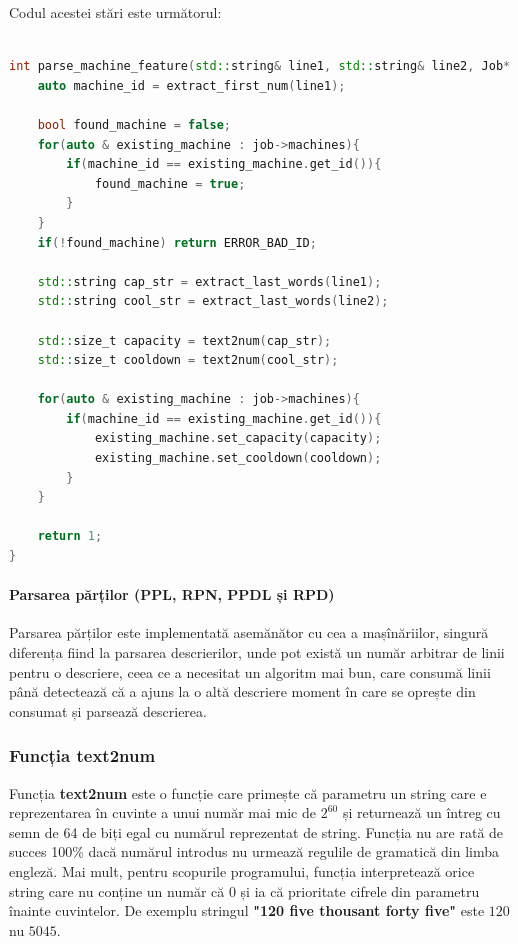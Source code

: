 \documentclass[12pt, twoside]{article}
\begin{document}
Codul acestei stări este următorul:
\pagebreak
\begin{lstlisting}[language={C++},breaklines,frame={single}]

int parse_machine_feature(std::string& line1, std::string& line2, Job* job){
    auto machine_id = extract_first_num(line1);

    bool found_machine = false;
    for(auto & existing_machine : job->machines){
        if(machine_id == existing_machine.get_id()){
            found_machine = true;
        }
    }
    if(!found_machine) return ERROR_BAD_ID;

    std::string cap_str = extract_last_words(line1);
    std::string cool_str = extract_last_words(line2);

    std::size_t capacity = text2num(cap_str);
    std::size_t cooldown = text2num(cool_str);

    for(auto & existing_machine : job->machines){
        if(machine_id == existing_machine.get_id()){
            existing_machine.set_capacity(capacity);
            existing_machine.set_cooldown(cooldown);
        }
    }

    return 1;
}
\end{lstlisting}

\paragraph{Parsarea părților (PPL, RPN, PPDL și RPD)}

Parsarea părților este implementată asemănător cu cea
a mașînăriilor, singură diferența fiind la parsarea
descrierilor, unde pot există un număr arbitrar de linii pentru
o descriere, ceea ce a necesitat un algoritm mai bun, care
consumă linii până detectează că a ajuns la o altă descriere
moment în care se oprește din consumat și parsează descrierea.

\subsubsection{Funcția text2num}

Funcția \textbf{text2num} este o funcție care primește că
parametru un string care e reprezentarea în cuvinte a unui
număr mai mic de $2^{60}$ și returnează un întreg cu semn de
64 de biți egal cu numărul reprezentat de string. Funcția nu
are rată de succes 100\% dacă numărul introdus nu urmează
regulile de gramatică din limba engleză. Mai mult, pentru
scopurile programului, funcția interpretează orice string
care nu conține un număr că $0$ și ia că prioritate cifrele
din parametru înainte cuvintelor. De exemplu stringul 
\textbf{"120 five thousant forty five"} este $120$ nu $5045$.
\end{document}
